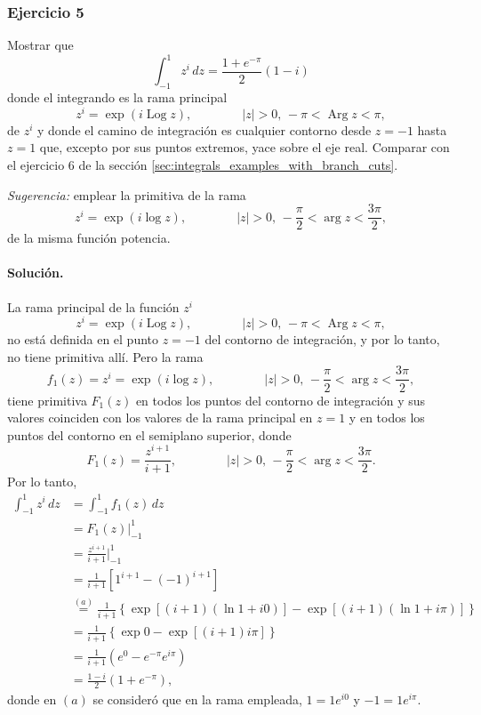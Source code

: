 \documentclass[a4paper]{report}
\DeclareMathOperator{\Arg}{Arg}
\DeclareMathOperator{\Log}{Log}
\begin{document}
\subsubsection*{Ejercicio 5}

Mostrar que 
\[
 \int_{-1}^1z^i\,dz=\frac{1+e^{-\pi}}{2}(1-i)
\]
donde el integrando es la rama principal 
\[
 z^i=\exp(i\Log z),
 \qquad\qquad
 |z|>0,\,-\pi<\Arg z<\pi,
\]
de \(z^i\) y donde el camino de integración es cualquier contorno desde \(z=-1\) hasta \(z=1\) que, excepto por sus puntos extremos, yace sobre el eje real. Comparar con el ejercicio 6 de la sección \ref{sec:integrals_examples_with_branch_cuts}.

\emph{Sugerencia:} emplear la primitiva de la rama 
\[
 z^i=\exp(i\log z),
 \qquad\qquad
 |z|>0,\,-\frac{\pi}{2}<\arg z<\frac{3\pi}{2},
\]
de la misma función potencia.

\paragraph{Solución.} La rama principal de la función \(z^i\)
\[
 z^i=\exp(i\Log z),
 \qquad\qquad
 |z|>0,\,-\pi<\Arg z<\pi,
\]
no está definida en el punto \(z=-1\) del contorno de integración, y por lo tanto, no tiene primitiva allí. Pero la rama
\[
 f_1(z)=z^i=\exp(i\log z),
 \qquad\qquad
 |z|>0,\,-\frac{\pi}{2}<\arg z<\frac{3\pi}{2},
\]
tiene primitiva \(F_1(z)\) en todos los puntos del contorno de integración y sus valores coinciden con los valores de la rama principal en \(z=1\) y en todos los puntos del contorno en el semiplano superior, donde 
\[
 F_1(z)=\frac{z^{i+1}}{i+1},
 \qquad\qquad
 |z|>0,\,-\frac{\pi}{2}<\arg z<\frac{3\pi}{2}.
\]
Por lo tanto,
\begin{align*}
 \int_{-1}^1z^i\,dz&=\int_{-1}^1f_1(z)\,dz\\
  &=F_1(z)\bigg|_{-1}^1\\
  &=\frac{z^{i+1}}{i+1}\bigg|_{-1}^1\\
  &=\frac{1}{i+1}\left[1^{i+1}-(-1)^{i+1}\right]\\
  &\overset{(a)}{=}\frac{1}{i+1}\left\{\exp\left[(i+1)(\ln1+i0)\right]-\exp\left[(i+1)(\ln1+i\pi)\right]\right\}\\
  &=\frac{1}{i+1}\left\{\exp0-\exp\left[(i+1)i\pi\right]\right\}\\
  &=\frac{1}{i+1}\left(e^0-e^{-\pi}e^{i\pi}\right)\\
  &=\frac{1-i}{2}(1+e^{-\pi}),
\end{align*}
donde en \((a)\) se consideró que en la rama empleada, \(1=1e^{i0}\) y \(-1=1e^{i\pi}\). 
\end{document}
